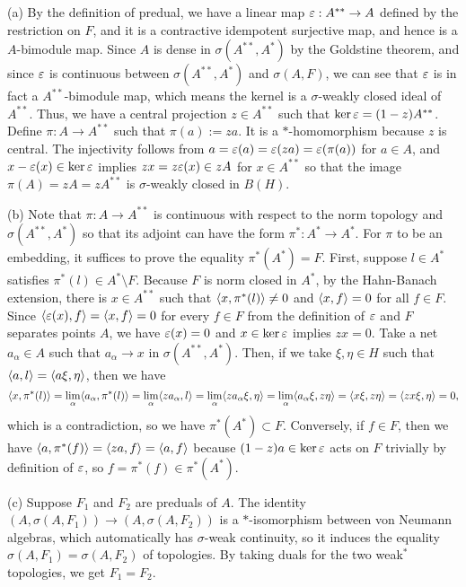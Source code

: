 \documentclass{../../large}
\begin{document}
\begin{pf}
(a)
By the definition of predual, we have a linear map $\varepsilon:A^{**}\to A$ defined by the restriction on $F$, and it is a contractive idempotent surjective map, and hence is a $A$-bimodule map.
Since $A$ is dense in $\sigma(A^{**},A^*)$ by the Goldstine theorem, and since $\varepsilon$ is continuous between $\sigma(A^{**},A^*)$ and $\sigma(A,F)$, we can see that $\varepsilon$ is in fact a $A^{**}$-bimodule map, which means the kernel is a $\sigma$-weakly closed ideal of $A^{**}$.
Thus, we have a central projection $z\in A^{**}$ such that $\ker\varepsilon=(1-z)A^{**}$.
Define $\pi:A\to A^{**}$ such that $\pi(a):=za$.
It is a $*$-homomorphism because $z$ is central.
The injectivity follows from $a=\varepsilon(a)=\varepsilon(za)=\varepsilon(\pi(a))$ for $a\in A$, and $x-\varepsilon(x)\in\ker\varepsilon$ implies $zx=z\varepsilon(x)\in zA$ for $x\in A^{**}$ so that the image $\pi(A)=zA=zA^{**}$ is $\sigma$-weakly closed in $B(H)$.

(b)
Note that $\pi:A\to A^{**}$ is continuous with respect to the norm topology and $\sigma(A^{**},A^*)$ so that its adjoint can have the form $\pi^*:A^*\to A^*$.
For $\pi$ to be an embedding, it suffices to prove the equality $\pi^*(A^*)=F$.
First, suppose $l\in A^*$ satisfies $\pi^*(l)\in A^*\setminus F$.
Because $F$ is norm closed in $A^*$, by the Hahn-Banach extension, there is $x\in A^{**}$ such that $\langle x,\pi^*(l)\rangle\ne0$ and $\langle x,f\rangle=0$ for all $f\in F$.
Since $\langle\varepsilon(x),f\rangle=\langle x,f\rangle=0$ for every $f\in F$ from the definition of $\varepsilon$ and $F$ separates points $A$, we have $\varepsilon(x)=0$ and $x\in\ker\varepsilon$ implies $zx=0$.
Take a net $a_\alpha\in A$ such that $a_\alpha\to x$ in $\sigma(A^{**},A^*)$.
Then, if we take $\xi,\eta\in H$ such that $\langle a,l\rangle=\langle a\xi,\eta\rangle$, then we have
\[\langle x,\pi^*(l)\rangle=\lim_\alpha\langle a_\alpha,\pi^*(l)\rangle=\lim_\alpha\langle za_\alpha,l\rangle=\lim_\alpha\langle za_\alpha\xi,\eta\rangle=\lim_\alpha\langle a_\alpha\xi,z\eta\rangle=\langle x\xi,z\eta\rangle=\langle zx\xi,\eta\rangle=0,\]
which is a contradiction, so we have $\pi^*(A^*)\subset F$.
Conversely, if $f\in F$, then we have $\langle a,\pi^*(f)\rangle=\langle za,f\rangle=\langle a,f\rangle$ because $(1-z)a\in\ker\varepsilon$ acts on $F$ trivially by definition of $\varepsilon$, so $f=\pi^*(f)\in\pi^*(A^*)$.

(c)
Suppose $F_1$ and $F_2$ are preduals of $A$.
The identity $(A,\sigma(A,F_1))\to(A,\sigma(A,F_2))$ is a $*$-isomorphism between von Neumann algebras, which automatically has $\sigma$-weak continuity, so it induces the equality $\sigma(A,F_1)=\sigma(A,F_2)$ of topologies.
By taking duals for the two weak$^*$ topologies, we get $F_1=F_2$.
\end{pf}
\end{document}
